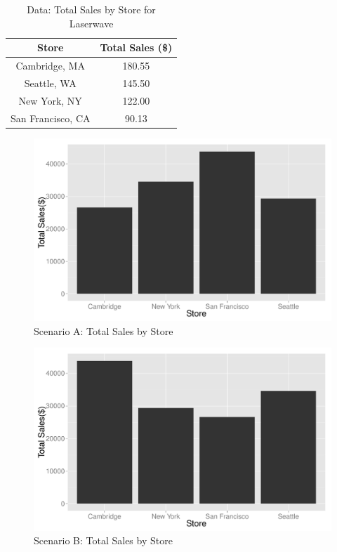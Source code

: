 \begin{table}[htb]
  \centering
  \begin{tabular}{cc} \hline
  Store & Total Sales (\$) \\ \hline
  Cambridge, MA & 180.55 \\ \hline
  Seattle, WA &  145.50\\ \hline
  New York, NY & 122.00 \\ \hline
  San Francisco, CA & 90.13 \\ \hline
  \end{tabular}
  \caption{Data: Total Sales by Store for Laserwave}\label{tab:staplerX} 
\end{table}

\begin{figure}[htb]
  \centering
    \includegraphics[width=12cm]{Images/dist2.pdf}
\caption{Scenario A: Total Sales by Store}
\label{fig:staplerX-a}
\end{figure}

\begin{figure}[htb]
  \centering
    \includegraphics[width=12cm]{Images/dist3.pdf}
  \caption{Scenario B: Total Sales by Store}
  \label{fig:staplerX-b}
\end{figure}

